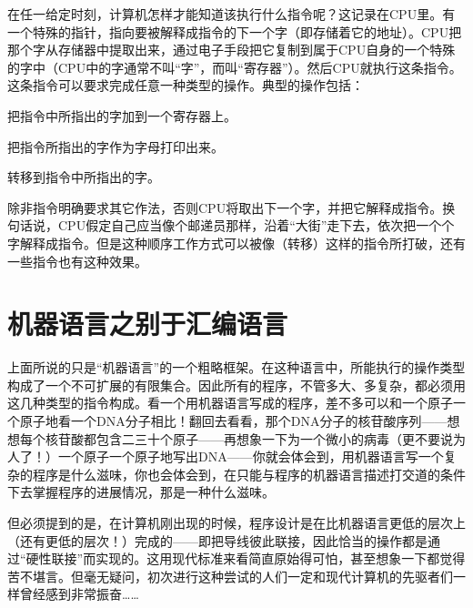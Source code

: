 在任一给定时刻，计算机怎样才能知道该执行什么指令呢？这记录在CPU里。有一个特殊的指针，指向要被解释成指令的下一个字（即存储着它的地址）。CPU把那个字从存储器中提取出来，通过电子手段把它复制到属于CPU自身的一个特殊的字中（CPU中的字通常不叫“字”，而叫“寄存器”）。然后CPU就执行这条指令。这条指令可以要求完成任意一种类型的操作。典型的操作包括：

\begin{description}[format=\inst,labelindent=\parindent,
  leftmargin=2\parindent,itemindent=!,labelsep=\ccwd]
\item[{ADD [加]}] 把指令中所指出的字加到一个寄存器上。


\item[{PRINT [打印]}]把指令所指出的字作为字母打印出来。


\item[{JUMP [转移]}]转移到指令中所指出的字。

\end{description}

除非指令明确要求其它作法，否则CPU将取出下一个字，并把它解释成指令。换句话说，CPU假定自己应当像个邮递员那样，沿着“大街”走下去，依次把一个个字解释成指令。但是这种顺序工作方式可以被像（转移）这样的指令所打破，还有一些指令也有这种效果。

\section{机器语言之别于汇编语言}

上面所说的只是“机器语言”的一个粗略框架。在这种语言中，所能执行的操作类型构成了一个不可扩展的有限集合。因此所有的程序，不管多大、多复杂，都必须用这几种类型的指令构成。看一个用机器语言写成的程序，差不多可以和一个原子一个原子地看一个DNA分子相比！翻回去看看，那个DNA分子的核苷酸序列——想想每个核苷酸都包含二三十个原子——再想象一下为一个微小的病毒（更不要说为人了！）一个原子一个原子地写出DNA——你就会体会到，用机器语言写一个复杂的程序是什么滋味，你也会体会到，在只能与程序的机器语言描述打交道的条件下去掌握程序的进展情况，那是一种什么滋味。

但必须提到的是，在计算机刚出现的时候，程序设计是在比机器语言更低的层次上（还有更低的层次！）完成的——即把导线彼此联接，因此恰当的操作都是通过“硬性联接”而实现的。这用现代标准来看简直原始得可怕，甚至想象一下都觉得苦不堪言。但毫无疑问，初次进行这种尝试的人们一定和现代计算机的先驱者们一样曾经感到非常振奋……

